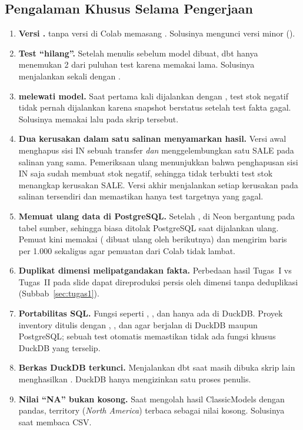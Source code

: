 \subsection{Pengalaman Khusus Selama Pengerjaan}
\begin{enumerate}
    \item \textbf{Versi .}  tanpa versi di Colab memasang . Solusinya mengunci versi minor ().
    \item \textbf{Test ``hilang''.} Setelah menulis  sebelum model dibuat, dbt hanya menemukan 2 dari puluhan test karena  memakai  lama. Solusinya menjalankan sekali dengan .
    \item \textbf{ melewati model.} Saat  pertama kali dijalankan dengan , test stok negatif tidak pernah dijalankan karena snapshot berstatus  setelah test fakta gagal. Solusinya memakai  lalu  pada skrip tersebut.
    \item \textbf{Dua kerusakan dalam satu salinan menyamarkan hasil.} Versi awal  menghapus sisi IN sebuah transfer \emph{dan} menggelembungkan satu SALE pada salinan yang sama. Pemeriksaan ulang menunjukkan bahwa penghapusan sisi IN saja sudah membuat stok negatif, sehingga tidak terbukti test stok menangkap kerusakan SALE. Versi akhir menjalankan setiap kerusakan pada salinan tersendiri dan memastikan hanya test targetnya yang gagal.
    \item \textbf{Memuat ulang data di PostgreSQL.} Setelah ,   di Neon bergantung pada tabel sumber, sehingga  biasa ditolak PostgreSQL saat  dijalankan ulang. Pemuat kini memakai  ( dibuat ulang oleh  berikutnya) dan mengirim baris per 1.000 sekaligus agar pemuatan dari Colab tidak lambat.
    \item \textbf{Duplikat dimensi melipatgandakan fakta.} Perbedaan hasil Tugas~I vs Tugas~II pada slide dapat direproduksi persis oleh dimensi tanpa deduplikasi (Subbab~\ref{sec:tugas1}).
    \item \textbf{Portabilitas SQL.} Fungsi seperti , , dan  hanya ada di DuckDB. Proyek inventory ditulis dengan , , dan  agar berjalan di DuckDB maupun PostgreSQL; sebuah test otomatis memastikan tidak ada fungsi khusus DuckDB yang terselip.
    \item \textbf{Berkas DuckDB terkunci.} Menjalankan dbt saat  masih dibuka skrip lain menghasilkan . DuckDB hanya mengizinkan satu proses penulis.
    \item \textbf{Nilai ``NA'' bukan kosong.} Saat mengolah hasil ClassicModels dengan pandas, territory  (\textit{North America}) terbaca sebagai nilai kosong. Solusinya  saat membaca CSV.
\end{enumerate}

